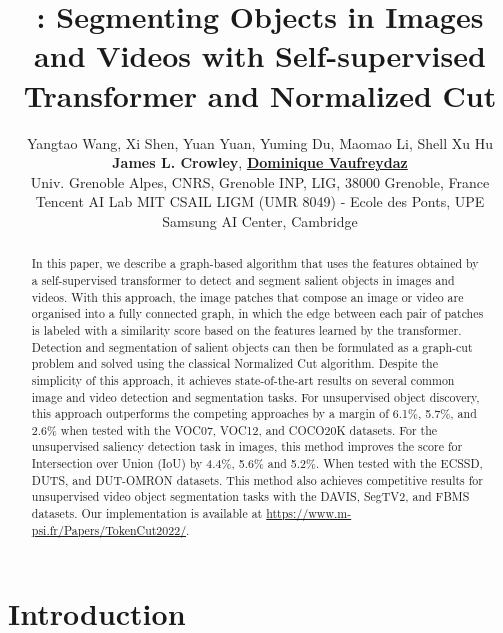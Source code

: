 \documentclass[twocolumn]{article}
\title{\name: Segmenting Objects in Images and Videos with Self-supervised Transformer and Normalized Cut}
\author{Yangtao Wang, Xi Shen, Yuan Yuan,  Yuming Du,  Maomao Li, Shell Xu Hu \\ \textbf{James L. Crowley}, \textbf{\href{https://research.vaufreydaz.org/}{\color{black}Dominique Vaufreydaz}} \\
 Univ. Grenoble Alpes, CNRS, Grenoble INP, LIG, 38000 Grenoble, France\\
 Tencent AI Lab \hspace{5mm}
 MIT CSAIL 
 LIGM (UMR 8049) - Ecole des Ponts, UPE \\
 Samsung AI Center, Cambridge \hspace{5mm}
}
\begin{document}
\twocolumn[{\begin{@twocolumnfalse}
    \maketitle
  \end{@twocolumnfalse}
}]


\setcounter{footnote}{0}
\renewcommand{\thefootnote}{*}

\begin{abstract}
In this paper, we describe a graph-based algorithm that uses the
features obtained by a self-supervised transformer to detect and segment salient objects in images and videos. 
With this approach, the image patches that compose an image or video are organised into a fully connected graph, in which the edge between each pair of patches is labeled with a similarity score based on the features learned by the transformer. Detection and segmentation of salient objects can then be formulated as a graph-cut problem and solved using the classical Normalized Cut algorithm. Despite the simplicity of this approach, it achieves state-of-the-art results on several common image and video detection and segmentation tasks. For unsupervised object discovery, this approach outperforms the competing approaches by a margin of 6.1\%, 5.7\%, and 2.6\% when tested with the VOC07, VOC12, and COCO20K datasets. For the unsupervised saliency detection task in images, this method improves the score for Intersection over Union (IoU) by 4.4\%, 5.6\% and 5.2\%. When tested with the ECSSD, DUTS, and DUT-OMRON datasets. This method also achieves competitive results for unsupervised video object segmentation tasks with the DAVIS, SegTV2, and FBMS datasets. Our implementation is available at  \href{https://www.m-psi.fr/Papers/TokenCut2022/}{https://www.m-psi.fr/Papers/TokenCut2022/}.

\end{abstract}

\section{Introduction}
\end{document}
